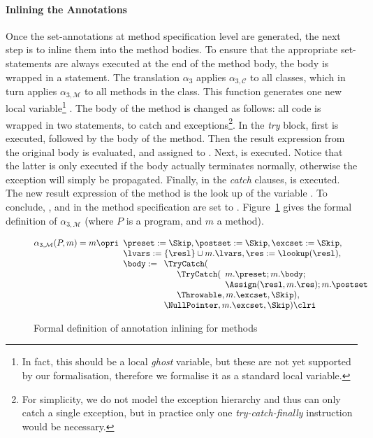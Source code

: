 \paragraph{Inlining the Annotations}
Once the set-annotations at method specification level are generated,
the next step is to inline them into the method bodies.  To ensure
that the appropriate set-statements are always executed at the end of
the method body, the body is wrapped in a
\TryCatch statement. The translation \(\alpha_3\) applies
\(\alpha_{3, \mathcal{C}}\) to all classes, which in turn applies
\(\alpha_{3, \mathcal{M}}\) to all methods in the class. This function
generates one new local variable\footnote{In fact, this should be a
local \emph{ghost} variable, but these are not yet supported by our
formalisation, therefore we formalise it as a standard local
variable.} \resl. The body of the method is changed as follows: all
code is wrapped in two \TryCatch statements, to catch \Throwable and
\NullPointer exceptions\footnote{For simplicity, we do not model the
exception hierarchy and thus \TryCatch can only catch a single
exception, but in practice only one \emph{try-catch-finally} instruction
would be necessary.}. In the \emph{try} block, first \preset is
executed, followed by the body of the method. Then the result
expression from the original body is evaluated, and assigned to
\resl. Next, \postset is executed. Notice that the latter
is only executed if the body actually terminates normally, otherwise
the exception will simply be propagated. Finally, in the \emph{catch}
clauses, \excset is executed. The new result expression of the method
is the look up of the variable \resl. To conclude, \preset,
\postset and  \excset in the method specification are set to
\Skip. Figure~\ref{FigInline} gives the formal definition of
\(\alpha_{3, \mathcal{M}}\) (where \(P\) is a program, and \(m\) a method).

\begin{figure}[t]
\[
\alpha_{3, \mathcal{M}}(P, m) = m \opri
\begin{array}[t]{l}
\preset := \Skip, \postset := \Skip, \excset := \Skip,\\
\lvars := \{\resl\} \cup m.\lvars,
\res := \lookup(\resl), \\
\body :=
\begin{array}[t]{l}
\TryCatch(\\
\quad \begin{array}[t]{l}
  \TryCatch( \begin{array}[t]{l} m.\preset; m.\body; \\ \Assign(\resl,
  m.\res); m.\postset\\ \end{array}\\ \Throwable, m.\excset, \Skip),
\end{array}\\
\NullPointer, m.\excset, \Skip) \clri
\end{array}
\end{array}
\]\vspace*{-2em}
\caption{Formal definition of annotation inlining for methods}\label{FigInline}
\end{figure}


